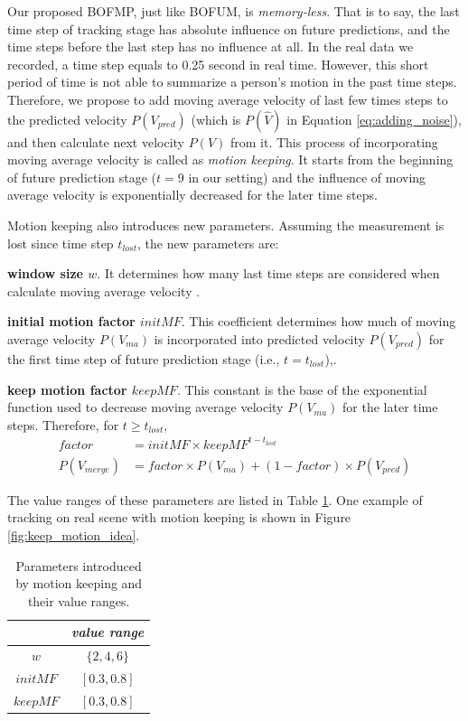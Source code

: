 Our proposed BOFMP, just like BOFUM, is \textit{memory-less}. That is to say, the last time step of tracking stage has absolute influence on future predictions, and the time steps before the last step has no influence at all. In the real data we recorded, a time step equals to 0.25 second in real time. However, this short period of time is not able to summarize a person's motion in the past time steps. Therefore, we propose to add moving average velocity of last few times steps to the predicted velocity $P(V_{pred})$ (which is $P(\hat{V})$ in Equation \ref{eq:adding_noise}), and then calculate next velocity $P(V)$ from it. This process of incorporating moving average velocity is called as \textit{motion keeping}. It starts from the beginning of future prediction stage ($t=9$ in our setting) and the influence of moving average velocity is exponentially decreased for the later time steps.

Motion keeping also introduces new parameters. Assuming the measurement is lost since time step $t_{lost}$, the new parameters are: 
\begin{my_enumerate}
\item \textbf{window size $w$}. It determines how many last time steps are considered when calculate moving average velocity .
\item \textbf{initial motion factor \( initMF\)}. This coefficient determines how much of moving average velocity $P(V_{ma})$ is incorporated into predicted velocity $P(V_{pred})$ for the first time step of future prediction stage (i.e., $t=t_{lost}$),. 
\item \textbf{keep motion factor \( keepMF \)}. This constant is the base of the exponential function used to decrease moving average velocity $P(V_{ma})$ for the later time steps. Therefore, for $t \geq t_{lost}$, 
\begin{align}
factor &= initMF \times keepMF^{t-t_{lost}} \\
P(V_{merge}) &= factor \times P(V_{ma}) + (1-factor) \times P(V_{pred})
\end{align}

\end{my_enumerate}

The value ranges of these parameters are listed in Table \ref{table:motion_keeping_param_range}. One example of tracking on real scene with motion keeping is shown in Figure \ref{fig:keep_motion_idea}.
\begin{table}[H]
\centering  
\begin{tabularx}{.3\textwidth}{c|c}
    \hline
      &  \textit{value range } \\ \hline
    $w$ & \( \{2, 4, 6\} \)  \\
     $initMF$ & \( [0.3, 0.8]\) \\  
     $keepMF$ & \( [0.3, 0.8]\) \\    
   \hline
  \end{tabularx}
\caption{Parameters introduced by motion keeping and their value ranges.}
\label{table:motion_keeping_param_range}
\end{table}

